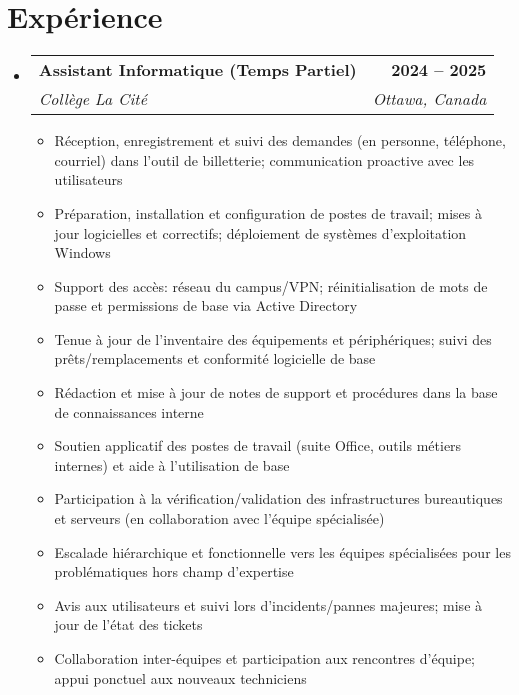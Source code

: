 \documentclass[letterpaper,11pt]{article}
\makeatletter
\newcommand{\resumeItem}[1]{
  \item\small{
    {#1 \vspace{0pt}}
  }
}
\newcommand{\resumeSubheading}[4]{
  \vspace{-2pt}\item
    \begin{tabular*}{1.0\textwidth}[t]{l@{\extracolsep{\fill}}r}
      \textbf{#1} & \textbf{\small #2} \\
      \textit{\small#3} & \textit{\small #4} \\
    \end{tabular*}\vspace{-7pt}
}
\newcommand{\resumeSubHeadingListStart}{\begin{itemize}[leftmargin=0.0in, label={}]}
\newcommand{\resumeSubHeadingListEnd}{\end{itemize}}\vspace{0pt}
\newcommand{\resumeItemListStart}{\begin{itemize}}
\newcommand{\resumeItemListEnd}{\end{itemize}\vspace{-5pt}}
\makeatother
\begin{document}
\section{Expérience}
    \resumeSubHeadingListStart
            \resumeSubheading{Assistant Informatique (Temps Partiel)}{2024 -- 2025}{Collège La Cité}{Ottawa, Canada} 
                \resumeItemListStart
                    \resumeItem{Réception, enregistrement et suivi des demandes (en personne, téléphone, courriel) dans l'outil de billetterie; communication proactive avec les utilisateurs}
                    \resumeItem{Préparation, installation et configuration de postes de travail; mises à jour logicielles et correctifs; déploiement de systèmes d'exploitation Windows}
                    \resumeItem{Support des accès: réseau du campus/VPN; réinitialisation de mots de passe et permissions de base via Active Directory}
                    \resumeItem{Tenue à jour de l'inventaire des équipements et périphériques; suivi des prêts/remplacements et conformité logicielle de base}
                    \resumeItem{Rédaction et mise à jour de notes de support et procédures dans la base de connaissances interne}
                    \resumeItem{Soutien applicatif des postes de travail (suite Office, outils métiers internes) et aide à l'utilisation de base}
                    \resumeItem{Participation à la vérification/validation des infrastructures bureautiques et serveurs (en collaboration avec l'équipe spécialisée)}
                    \resumeItem{Escalade hiérarchique et fonctionnelle vers les équipes spécialisées pour les problématiques hors champ d'expertise}
                    \resumeItem{Avis aux utilisateurs et suivi lors d'incidents/pannes majeures; mise à jour de l'état des tickets}
                    \resumeItem{Collaboration inter-équipes et participation aux rencontres d'équipe; appui ponctuel aux nouveaux techniciens}
                    \resumeItemListEnd

    \resumeSubHeadingListEnd
    \vspace{-12pt}

\end{document}
